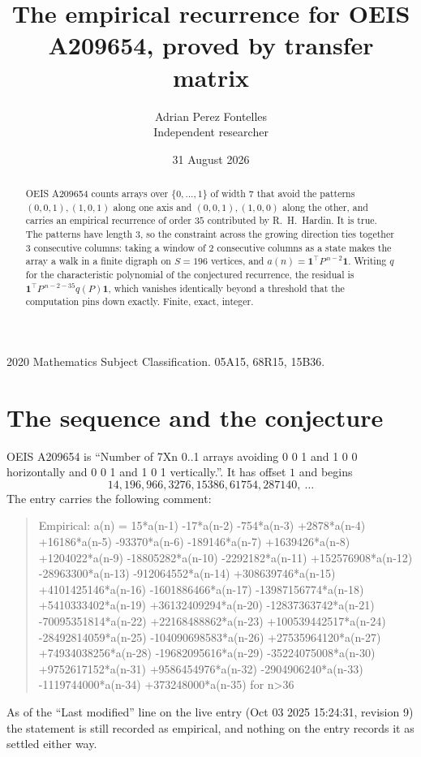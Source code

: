 \documentclass[11pt,a4paper]{article}
\title{The empirical recurrence for OEIS A209654, proved by transfer matrix}
\author{Adrian Perez Fontelles\\ \small Independent researcher}
\date{31 August 2026}
\theoremstyle{plain}
\theoremstyle{definition}
\begin{document}
\maketitle

\begin{abstract}
OEIS A209654 counts arrays over $\{0,\dots,1\}$ of width $7$ that avoid the patterns
$(0,0,1), (1,0,1)$ along one axis and $(0,0,1), (1,0,0)$ along the other, and carries an empirical recurrence of
order $35$ contributed by R.~H.~Hardin. It is true. The patterns have length $3$, so
the constraint across the growing direction ties together $3$ consecutive columns: taking a
window of $2$ consecutive columns as a state makes the array a walk in a finite digraph
on $S=196$ vertices, and $a(n)=\mathbf{1}^{\!\top}P^{\,n-2}\mathbf{1}$. Writing $q$
for the characteristic polynomial of the conjectured recurrence, the residual is
$\mathbf{1}^{\!\top}P^{\,n-2-35}q(P)\mathbf{1}$, which vanishes identically
beyond a threshold that the computation pins down exactly. Finite, exact, integer.
\end{abstract}

\noindent\small 2020 Mathematics Subject Classification. 05A15, 68R15, 15B36.\normalsize

\section{The sequence and the conjecture}

OEIS A209654 is ``Number of 7Xn 0..1 arrays avoiding 0 0 1 and 1 0 0 horizontally and 0 0 1 and 1 0 1 vertically.''. It has offset
$1$ and begins
\[
14, 196, 966, 3276, 15386, 61754, 287140,\ \dots
\]
The entry carries the following comment:
\begin{quote}\small
Empirical: a(n) = 15*a(n-1) -17*a(n-2) -754*a(n-3) +2878*a(n-4) +16186*a(n-5) -93370*a(n-6) -189146*a(n-7) +1639426*a(n-8) +1204022*a(n-9) -18805282*a(n-10) -2292182*a(n-11) +152576908*a(n-12) -28963300*a(n-13) -912064552*a(n-14) +308639746*a(n-15) +4101425146*a(n-16) -1601886466*a(n-17) -13987156774*a(n-18) +5410333402*a(n-19) +36132409294*a(n-20) -12837363742*a(n-21) -70095351814*a(n-22) +22168488862*a(n-23) +100539442517*a(n-24) -28492814059*a(n-25) -104090698583*a(n-26) +27535964120*a(n-27) +74934038256*a(n-28) -19682095616*a(n-29) -35224075008*a(n-30) +9752617152*a(n-31) +9586454976*a(n-32) -2904906240*a(n-33) -1119744000*a(n-34) +373248000*a(n-35) for n>36
\end{quote}
As of the ``Last modified'' line on the live entry (Oct 03 2025 15:24:31, revision
9) the statement is still recorded as empirical, and nothing on the entry
records it as settled either way.
\end{document}
